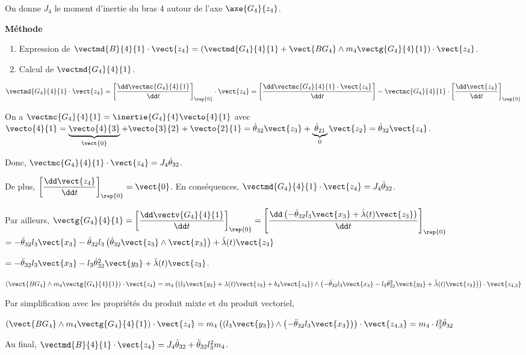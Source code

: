 \ifprof
\begin{corrige}
On donne $J_4$ le moment d'inertie du bras 4 autour de l'axe $\axe{G_4}{z_4}$.

\textbf{Méthode}
\begin{enumerate}
\item Expression de $\vectmd{B}{4}{1}\cdot\vect{z_4} = \left( \vectmd{G_4}{4}{1} + \vect{BG_4}\wedge m_4 \vectg{G_4}{4}{1}\right)\cdot\vect{z_4}$.
\item Calcul de $\vectmd{G_4}{4}{1}$.
\end{enumerate}

$\vectmd{G_4}{4}{1} \cdot\vect{z_4} = \left[ \dfrac{\dd \vectmc{G_4}{4}{1}}{\dd t} \right]_{\rep{0}}\cdot\vect{z_4}
=\left[ \dfrac{\dd \vectmc{G_4}{4}{1}\cdot \vect{z_4}}{\dd t} \right]-\vectmc{G_4}{4}{1}\cdot\left[ \dfrac{\dd \vect{z_4}}{\dd t} \right]_{\rep{0}}$



On a $\vectmc{G_4}{4}{1} =\inertie{G_4}{4} \vecto{4}{1}$ avec $\vecto{4}{1}=\underbrace{\vecto{4}{3}}_{\vect{0}}+\vecto{3}{2}+\vecto{2}{1} =\dot{\theta}_{32} \vect{z_3}+\underbrace{\dot{\theta}_{21}}_{0} \vect{z_2}=\dot{\theta}_{32} \vect{z_4}$.

Donc,
$\vectmc{G_4}{4}{1}\cdot\vect{z_4}=J_4\dot{\theta}_{32} $.

De plus, $ \left[ \dfrac{ \dd \vect{z_4}}{\dd t} \right]_{\rep{0}} = \vect{0} $. 
En conséquences, $\vectmd{G_4}{4}{1} \cdot\vect{z_4}  = J_4\ddot{\theta}_{32}$.

Par ailleurs, $\vectg{G_4}{4}{1}= \left[\dfrac{\dd \vectv{G_4}{4}{1}}{\dd t} \right]_{\rep{0}}=\left[\dfrac{\dd \left( -\dot{\theta}_{32}l_3\vect{x_3}  + \dot{\lambda}(t)\vect{z_3} \right)}{\dd t} \right]_{\rep{0}}$
$= -\ddot{\theta}_{32}l_3\vect{x_3} -\dot{\theta}_{32}l_3    \left(\dot{\theta}_{32} \vect{z_3}\wedge \vect{x_3} \right)  + \ddot{\lambda}(t)\vect{z_3}  $

$= -\ddot{\theta}_{32}l_3\vect{x_3} -l_3   \dot{\theta}_{32}^2  \vect{y_3} + \ddot{\lambda}(t)\vect{z_3}  $.

$\left(\vect{BG_4}\wedge m_4 \vectg{G_4}{4}{1}\right)\cdot\vect{z_4} = 
m_4\left( \left(l_3 \vect{y_3} + \lambda(t) \vect{z_3}+ b_4 \vect{z_4}\right) \wedge  \left(-\ddot{\theta}_{32}l_3\vect{x_3} -l_3   \dot{\theta}_{32}^2  \vect{y_3} + \ddot{\lambda}(t)\vect{z_3} \right) \right)\cdot \vect{z_{4,3}}$

Par simplification avec les propriétés du produit mixte et du produit vectoriel,

$
\left(\vect{BG_4}\wedge m_4 \vectg{G_4}{4}{1}\right)\cdot\vect{z_4} =
m_4\left( \left(l_3 \vect{y_3} \right) \wedge  \left(-\ddot{\theta}_{32}l_3\vect{x_3} \right) \right)\cdot \vect{z_{4,3}}
=m_4\cdot l_3^2\ddot{\theta}_{32}
$

Au final,  $\vectmd{B}{4}{1}\cdot\vect{z_4} = J_4 \ddot{\theta}_{32}+\ddot{\theta}_{32}l_3^2 m_4 $.

\end{corrige}
\else
\fi


